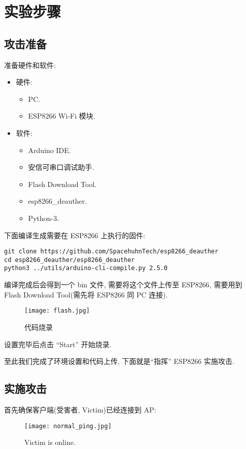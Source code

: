 \documentclass[../main.tex]{subfiles}
\begin{document}
\section{实验步骤}
\subsection{攻击准备}
准备硬件和软件:
\begin{itemize}
  \item 硬件:
    \begin{itemize}
      \item PC.
      \item ESP8266 Wi-Fi 模块.
    \end{itemize}
  \item 软件:
    \begin{itemize}
      \item Arduino IDE.
      \item 安信可串口调试助手.
      \item Flash Download Tool.
      \item esp8266\_deauther.
      \item Python-3.
    \end{itemize}
\end{itemize}

下面编译生成需要在 ESP8266 上执行的固件:
\begin{verbatim}
git clone https://github.com/SpacehuhnTech/esp8266_deauther
cd esp8266_deauther/esp8266_deauther
python3 ../utils/arduino-cli-compile.py 2.5.0
\end{verbatim}

编译完成后会得到一个 bin 文件, 需要将这个文件上传至 ESP8266, 需要用到 Flash
Download Tool(需先将 ESP8266 同 PC 连接).

\begin{figure}[H]
  \begin{center}
    \texttt{[image: flash.jpg]}
  \end{center}
  \caption{代码烧录}
\end{figure}

设置完毕后点击 ``Start'' 开始烧录.

至此我们完成了环境设置和代码上传, 下面就是``指挥'' ESP8266 实施攻击.
%
\subsection{实施攻击}
首先确保客户端(受害者, Victim)已经连接到 AP:
\begin{figure}[H]
  \begin{center}
    \texttt{[image: normal\_ping.jpg]}
  \end{center}
  \caption{Victim is online.}
\end{figure}
\end{document}
